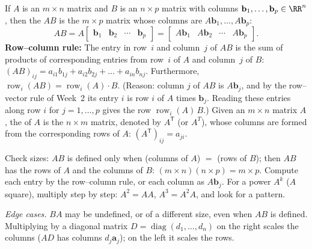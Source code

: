 \documentclass[10pt]{scrartcl}
\newcommand{\vv}[1]{\mathbf{#1}}
\begin{document}
\begin{definition*}
  \begin{itemize}
    \ii If $A$ is an $m\times n$ matrix and $B$ is an $n\times p$ matrix with columns $\vv b_1,\dots,\vv b_p\in\RR^n$, then the  $AB$ is the $m\times p$ matrix whose columns are $A\vv b_1,\dots,A\vv b_p$:
    \[
      AB = A\begin{bmatrix} \vv b_1 & \vv b_2 & \cdots & \vv b_p \end{bmatrix} = \begin{bmatrix} A\vv b_1 & A\vv b_2 & \cdots & A\vv b_p \end{bmatrix}.
    \]
    \ii \textbf{Row--column rule:} The entry in row~$i$ and column~$j$ of $AB$ is the sum of products of corresponding entries from row~$i$ of $A$ and column~$j$ of $B$: $(AB)_{ij}=a_{i1}b_{1j}+a_{i2}b_{2j}+\dots+a_{in}b_{nj}$. Furthermore, $\operatorname{row}_i(AB)=\operatorname{row}_i(A)\cdot B$. (Reason: column $j$ of $AB$ is $A\vv b_j$, and by the row--vector rule of Week~2 its entry $i$ is row $i$ of $A$ times $\vv b_j$. Reading these entries along row $i$ for $j=1,\dots,p$ gives the row $\operatorname{row}_i(A)\,B$.)
    \ii Given an $m\times n$ matrix $A$, the  of $A$ is the $n\times m$ matrix, denoted by $A^{\mathsf T}$ (or $A^T$), whose columns are formed from the corresponding rows of $A$: $(A^{\mathsf T})_{ij}=a_{ji}$.
  \end{itemize}
\end{definition*}

\begin{steps}
  \ii Check sizes: $AB$ is defined only when (columns of $A$) $=$ (rows of $B$); then $AB$ has the rows of $A$ and the columns of $B$: $(m\times n)(n\times p)=m\times p$.
  \ii Compute each entry by the row--column rule, or each column as $A\vv b_j$.
  \ii For a power $A^k$ ($A$ square), multiply step by step: $A^2=AA$, $A^3=A^2A$, and look for a pattern.
\end{steps}
\emph{Edge cases.} $BA$ may be undefined, or of a different size, even when $AB$ is defined. Multiplying by a diagonal matrix $D=\operatorname{diag}(d_1,\dots,d_n)$ on the right scales the columns ($AD$ has columns $d_j\vv a_j$); on the left it scales the rows.
\end{document}
